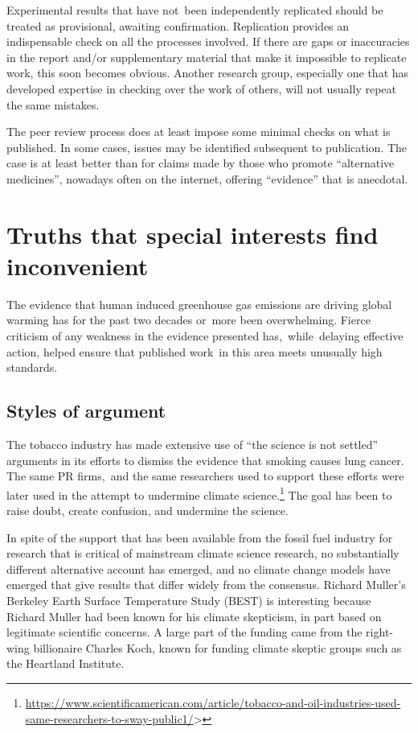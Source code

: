\documentclass[
  10pt,
  b5paper]{book}
\begin{document}
Experimental results that have not~been independently
replicated should be treated as provisional, awaiting
confirmation. Replication provides an indispensable
check on all the processes involved. If there are gaps
or inaccuracies in the report and/or supplementary
material that make it impossible to replicate work,
this soon becomes obvious. Another research group,
especially one that has developed expertise in
checking over the work of others, will not usually
repeat the same mistakes.

The peer review process does at least impose some minimal
checks on what is published. In some cases, issues
may be identified subsequent to publication. The case is
at least better than for claims made by those who promote
``alternative medicines'', nowadays often on the internet,
offering ``evidence'' that is anecdotal.

\hypertarget{truths-that-special-interests-find-inconvenient}{%
\section{Truths that special interests find inconvenient}\label{truths-that-special-interests-find-inconvenient}}

The evidence that human induced greenhouse gas emissions
are driving global warming has for the past two decades
or~more been overwhelming. Fierce criticism of any weakness
in the evidence presented has,~while~delaying effective
action, helped ensure that published work~in this area meets
unusually high standards.

\hypertarget{styles-of-argument}{%
\subsection*{Styles of argument}\label{styles-of-argument}}

The tobacco industry has made extensive use of ``the science is
not settled'' arguments in its efforts to dismiss the evidence
that smoking causes lung cancer. The same PR firms,~and the same
researchers used to support these efforts were later used in the
attempt to undermine climate
science.\footnote{\url{https://www.scientificamerican.com/article/tobacco-and-oil-industries-used-same-researchers-to-sway-public1/}\textgreater{}}
The goal has been to raise doubt, create confusion, and undermine
the science.

In spite of the support that has been available from the fossil
fuel industry for research that is critical of mainstream climate
science research, no substantially different alternative account
has emerged, and no climate change models have emerged that give
results that differ widely from the consensus. Richard Muller's
Berkeley Earth Surface Temperature Study (BEST) is interesting
because Richard Muller had been known for his climate skepticism,
in part based on legitimate scientific concerns. A large part of
the funding came from the right-wing billionaire Charles Koch,
known for funding climate skeptic groups such as the Heartland
Institute.
\end{document}
